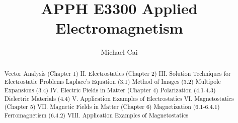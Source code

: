 \documentclass[a4paper]{report}
\author{Michael Cai}
\title{APPH E3300 Applied Electromagnetism
}
\begin{document}
\maketitle

\begin{abstract}
	Vector Analysis (Chapter 1)
	II. Electrostatics (Chapter 2)
	III. Solution Techniques for Electrostatic Problems
	Laplace’s Equation (3.1)
	Method of Images (3.2)
	Multipole Expansions (3.4)
	IV. Electric Fields in Matter (Chapter 4)
	Polarization (4.1-4.3)
	Dielectric Materials (4.4)
	V. Application Examples of Electrostatics
	VI. Magnetostatics (Chapter 5)
	VII. Magnetic Fields in Matter (Chapter 6)
	Magnetization (6.1-6.4.1)
	Ferromagnetism (6.4.2)
	VIII. Application Examples of Magnetostatics
	
\end{abstract}

\newpage



\pagestyle{plain}
\printbibliography{}
\end{document}
